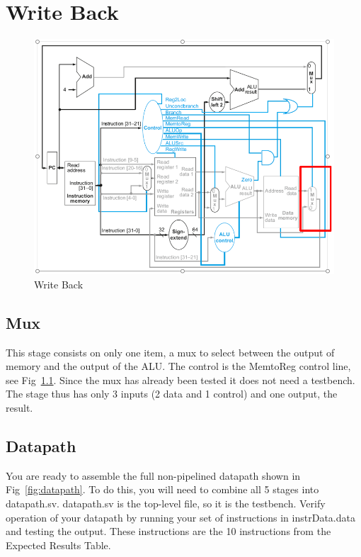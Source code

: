 \chapter{Write Back}


\begin{figure}
\caption{Write Back}\label{fig:wb}
\begin{center}
\includegraphics[width=\textwidth]{../images/writeback_stage.png}
\end{center}
\end{figure}

\WrapBarrier

\section{Mux}
This stage consists on only one item, a mux to select between the output of memory and the output of the ALU.  The control is the MemtoReg control line, see Fig~\ref{fig:wb}.  Since the mux has already been tested it does not need a testbench.  The stage thus has only 3 inputs (2 data and 1 control) and one output, the result.

\section{Datapath}
You are ready to assemble the full non-pipelined datapath shown in Fig~\ref{fig:datapath}.  To do this, you will need to combine all 5 stages into datapath.sv.  datapath.sv is the top-level file, so it is the testbench.  Verify operation of your datapath by running your set of instructions in instrData.data and testing the output.  These instructions are the 10 instructions from the Expected Results Table.  

